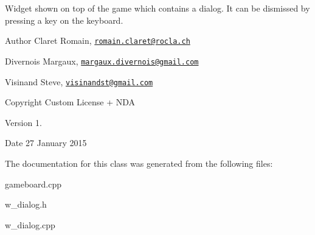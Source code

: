 Widget shown on top of the game which contains a dialog. It can be dismissed by pressing a key on the keyboard. \begin{DoxyAuthor}{Author}
Claret Romain, \href{mailto:romain.claret@rocla.ch}{\tt romain.\+claret@rocla.\+ch} 

Divernois Margaux, \href{mailto:margaux.divernois@gmail.com}{\tt margaux.\+divernois@gmail.\+com} 

Visinand Steve, \href{mailto:visinandst@gmail.com}{\tt visinandst@gmail.\+com} 
\end{DoxyAuthor}
\begin{DoxyCopyright}{Copyright}
Custom License + N\+D\+A 
\end{DoxyCopyright}
\begin{DoxyVersion}{Version}
1. 
\end{DoxyVersion}
\begin{DoxyDate}{Date}
27 January 2015 
\end{DoxyDate}


The documentation for this class was generated from the following files\+:\begin{DoxyCompactItemize}
\item 
gameboard.\+cpp\item 
w\+\_\+dialog.\+h\item 
w\+\_\+dialog.\+cpp\end{DoxyCompactItemize}
